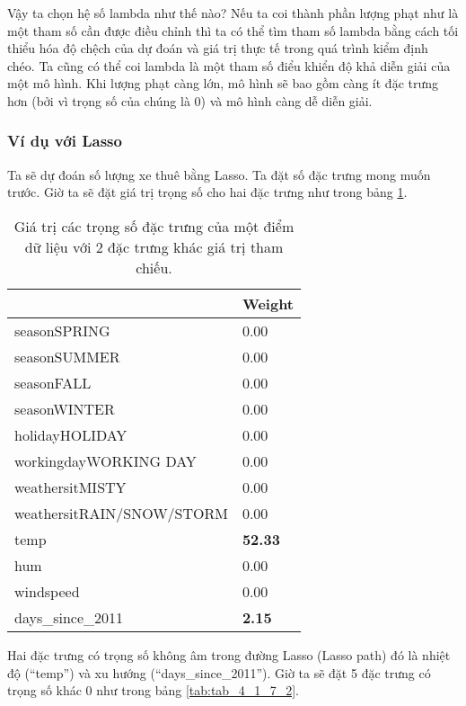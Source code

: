 Vậy ta chọn hệ số lambda như thế nào? Nếu ta coi thành phần lượng phạt như là một tham số cần được điều chỉnh thì ta có thể tìm tham số lambda bằng cách tối thiểu hóa độ chệch của dự đoán và giá trị thực tế trong quá trình kiểm định chéo. Ta cũng có thể coi lambda là một tham số điểu khiển độ khả diễn giải của một mô hình. Khi lượng phạt càng lớn, mô hình sẽ bao gồm càng ít đặc trưng hơn (bởi vì trọng số của chúng là 0) và mô hình càng dễ diễn giải.

\subsubsection{Ví dụ với Lasso}
Ta sẽ dự đoán số lượng xe thuê bằng Lasso. Ta đặt số đặc trưng mong muốn trước. Giờ ta sẽ đặt giá trị trọng số cho hai đặc trưng như trong bảng \ref{tab:tab_4_1_7}.

\begin{table}[]
\centering
\begin{tabular}{|l|l|}
\hline
                          & \textbf{Weight} \\ \hline
seasonSPRING              & 0.00            \\ \hline
seasonSUMMER              & 0.00            \\ \hline
seasonFALL                & 0.00            \\ \hline
seasonWINTER              & 0.00            \\ \hline
holidayHOLIDAY            & 0.00            \\ \hline
workingdayWORKING DAY     & 0.00            \\ \hline
weathersitMISTY           & 0.00            \\ \hline
weathersitRAIN/SNOW/STORM & 0.00            \\ \hline
temp                      & \textbf{52.33}  \\ \hline
hum                       & 0.00            \\ \hline
windspeed                 & 0.00            \\ \hline
days\_since\_2011         & \textbf{2.15}   \\ \hline
\end{tabular}
\caption{Giá trị các trọng số đặc trưng của một điểm dữ liệu với 2 đặc trưng khác giá trị tham chiếu.}
\label{tab:tab_4_1_7}
\end{table}

Hai đặc trưng có trọng số không âm trong đường Lasso (Lasso path) đó là nhiệt độ (``temp'') và xu hướng (``days\_since\_2011'').
Giờ ta sẽ đặt 5 đặc trưng có trọng số khác 0 như trong bảng \ref{tab:tab_4_1_7_2}.

